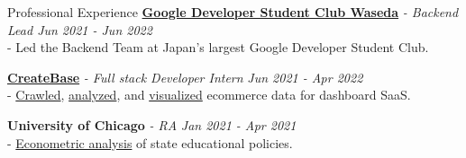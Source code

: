 \documentclass{resume} %
\begin{document}
\begin{rSection}{Professional Experience}
{ \bf\href{https://gdsc.community.dev/waseda-university/}{Google Developer Student Club Waseda}} \textit{ - Backend Lead \hfill {Jun 2021 - Jun 2022}}
\\- Led the Backend Team at Japan's largest Google Developer Student Club. %

{\bf \href{https://createbase.work/}{CreateBase}} {\textit{- Full stack Developer Intern }} \hfill {\em Jun 2021 - Apr 2022} 
\\- \uline{Crawled}, \uline{analyzed}, and \uline{visualized} ecommerce data for dashboard SaaS. 

{\bf University of Chicago} {\textit{ - RA }} \hfill {\em Jan 2021 - Apr 2021} 
\\- \uline{Econometric analysis} of state educational policies. 

\end{rSection}

\end{document}
